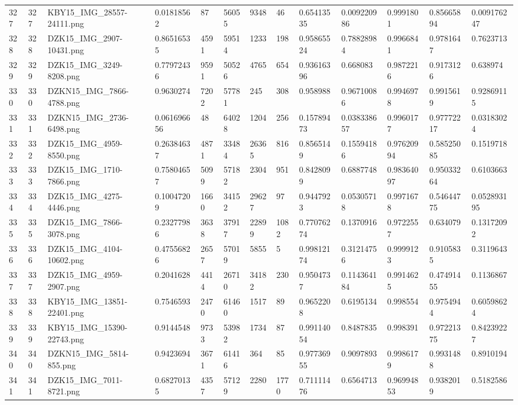 \documentclass[11pt, a4paper, twoside]{report}
\begin{document}
\begin{longtable}[c]{@{}lllllllllllll@{}}
327 & 327 & KBY15\_IMG\_28557-24111.png & 0.01818562 & 87 & 56055 & 9348 & 46 & 0.65413535 & 0.009220986 & 0.9991801 & 0.85665894 & 0.009176247 \\
328 & 328 & DZK15\_IMG\_2907-10431.png & 0.86516535 & 4591 & 59514 & 1233 & 198 & 0.95865524 & 0.78828984 & 0.9966841 & 0.9781647 & 0.7623713 \\
329 & 329 & DZK15\_IMG\_3249-8208.png & 0.77972436 & 9591 & 50526 & 4765 & 654 & 0.93616396 & 0.668083 & 0.9872216 & 0.9173126 & 0.638974 \\
330 & 330 & DZKN15\_IMG\_7866-4788.png & 0.9630274 & 7202 & 57781 & 245 & 308 & 0.958988 & 0.96710086 & 0.9946978 & 0.9915619 & 0.92869115 \\
331 & 331 & DZKN15\_IMG\_2736-6498.png & 0.061696656 & 48 & 64028 & 1204 & 256 & 0.15789473 & 0.038338657 & 0.9960177 & 0.97772217 & 0.03183024 \\
332 & 332 & DZK15\_IMG\_4959-8550.png & 0.26384637 & 4871 & 33484 & 26365 & 816 & 0.8565149 & 0.15594186 & 0.97620994 & 0.58525085 & 0.1519718 \\
333 & 333 & DZK15\_IMG\_1710-7866.png & 0.75804657 & 5099 & 57182 & 2304 & 951 & 0.8428099 & 0.6887748 & 0.98364097 & 0.95033264 & 0.6103663 \\
334 & 334 & DZK15\_IMG\_4275-4446.png & 0.10047209 & 1660 & 34152 & 29627 & 97 & 0.9447923 & 0.05305718 & 0.9971678 & 0.54644775 & 0.052893195 \\
335 & 335 & DZK15\_IMG\_7866-3078.png & 0.23277986 & 3638 & 37917 & 22899 & 1082 & 0.77076274 & 0.1370916 & 0.9722557 & 0.634079 & 0.13172092 \\
336 & 336 & DZK15\_IMG\_4104-10602.png & 0.47556826 & 2657 & 57019 & 5855 & 5 & 0.99812174 & 0.31214756 & 0.9999123 & 0.9105835 & 0.3119643 \\
337 & 337 & DZK15\_IMG\_4959-2907.png & 0.2041628 & 4414 & 26710 & 34182 & 230 & 0.9504737 & 0.114364184 & 0.9914625 & 0.47491455 & 0.1136867 \\
338 & 338 & KBY15\_IMG\_13851-22401.png & 0.7546593 & 2470 & 61460 & 1517 & 89 & 0.9652208 & 0.6195134 & 0.998554 & 0.9754944 & 0.60598624 \\
339 & 339 & KBY15\_IMG\_15390-22743.png & 0.9144548 & 9733 & 53982 & 1734 & 87 & 0.99114054 & 0.8487835 & 0.998391 & 0.97221375 & 0.84239227 \\
340 & 340 & DZKN15\_IMG\_5814-855.png & 0.9423694 & 3671 & 61416 & 364 & 85 & 0.97736955 & 0.9097893 & 0.9986179 & 0.9931488 & 0.8910194 \\
341 & 341 & DZK15\_IMG\_7011-8721.png & 0.68270135 & 4357 & 57129 & 2280 & 1770 & 0.71111476 & 0.6564713 & 0.96994853 & 0.9382019 & 0.5182586 \\

\end{longtable}
\end{document}
